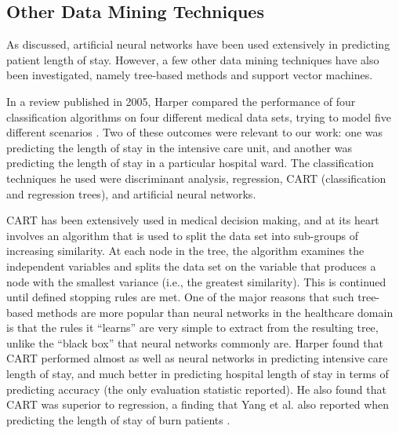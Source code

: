 \subsection{Other Data Mining Techniques}
As discussed, artificial neural networks have been used extensively in
predicting patient length of stay. However, a few other data mining techniques
have also been investigated, namely tree-based methods and support vector
machines.

In a review published in 2005, Harper compared the performance of four
classification algorithms on four different medical data sets, trying to
model five different scenarios \citep{Harper2005}. Two of these outcomes were
relevant to our work: one was predicting the length of stay in the intensive
care unit, and another was predicting the length of stay in a particular
hospital ward. The classification techniques he used were discriminant
analysis, regression, CART (classification and regression trees),
and artificial neural networks.

CART has been extensively used in medical decision making, and at its heart
involves an algorithm that is used to split the data set into sub-groups of
increasing similarity. At each node in the tree, the algorithm examines the
independent variables and splits the data set on the variable that produces
a node with the smallest variance (i.e., the greatest similarity). This is
continued until defined stopping rules are met. One of the major reasons that
such tree-based methods are more popular than neural networks in the
healthcare domain is that the rules it ``learns'' are very simple to extract
from the resulting tree, unlike the ``black box'' that neural networks commonly
are. Harper found that CART performed almost as well as neural networks in
predicting intensive care length of stay, and much better in predicting
hospital length of stay in terms of predicting accuracy (the only evaluation
statistic reported). He also found that CART was superior to regression, a
finding that Yang et al. also reported when predicting the length of stay of
burn patients \citep{Yang2010}.

